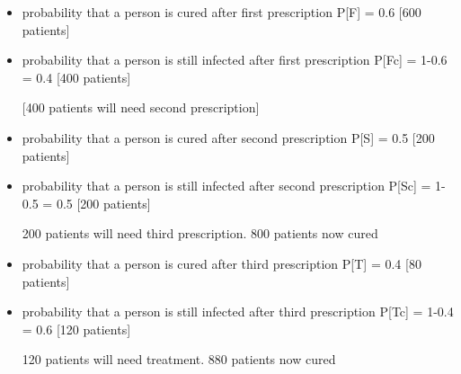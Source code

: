 \begin{itemize}
	
	\item probability that a person is cured after first prescription         P[F]                = 0.6  [600 patients]
	
	\item probability that a person is still infected after first prescription   P[Fc]             = 1-0.6 = 0.4  [400 patients]
	
	
	[400 patients will need second prescription]
	
	
	\item probability that a person is cured after second prescription     P[S]                    = 0.5  [200 patients]
	
	\item probability that a person is still infected after second prescription  P[Sc]              = 1-0.5 = 0.5  [200 patients]
	
	
	\item [200 patients will need third prescription. 800 patients now cured]
	
	
	\item probability that a person is cured after third prescription          P[T]               = 0.4  [80 patients]
	
	\item probability that a person is still infected after third prescription      P[Tc]          = 1-0.4 = 0.6  [120 patients]
	
	\item 
	[120 patients will need treatment. 880 patients now cured]
	
\end{itemize}

